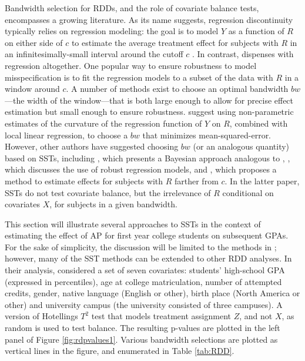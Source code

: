 \documentclass[sts]{imsart}\usepackage[]{graphicx}\usepackage[]{color}
\begin{document}
Bandwidth selection for RDDs, and the role of covariate balance tests,
encompasses a growing literature.
As its name suggests, regression discontinuity typically relies on
regression modeling: the goal is to model $Y$ as a function of $R$ on
either side of $c$ to estimate the average treatment effect for
subjects with $R$ in an infinitesimally-small interval around the
cutoff $c$ \citep[See][]{imbensLemiuxRDD}.
In contrast, \citet{cft} dispenses with regression altogether.
One popular way to ensure robustness to model misspecification is to
fit the regression models to a subset of the data with $R$ in a
window around $c$.
A number of methods exist to choose an optimal bandwidth $bw$---the width
of the window---that is both large enough to allow for precise effect
estimation but small enough to ensure robustness.
\citet{IK} suggest using non-parametric estimates of the curvature of
the regression function of $Y$ on $R$, combined with local linear
regression, to choose a $bw$ that minimizes mean-squared-error.
However, other authors have suggested choosing $bw$ (or an analogous quantity) based on
SSTs, including \citet{mattai}, which presents a Bayesian approach
analogous to \citet{cft}, \citet{salesHansen}, which discusses the use of robust
regression models,  and \citet{angristWanna}, which proposes a method
to estimate effects for subjects with $R$ farther from $c$.
In the latter paper, SSTs do not test covariate balance, but the
irrelevance of $R$ conditional on covariates $X$, for subjects in a
given bandwidth.

This section will illustrate several approaches to SSTs in the context
of estimating the effect of AP for first year college students on
subsequent GPAs.
For the sake of simplicity, the discussion will be limited to the methods in \citet{cft}; however, many of
the SST methods can be extended to other RDD analyses.
In their analysis, \citet{lso}  considered a set of seven covariates:
students' high-school GPA (expressed in percentiles), age at college
matriculation, number of attempted credits, gender, native language
(English or other), birth place (North America or other) and
university campus (the university consisted of three campuses).
A version of Hotellings $T^2$ test that models
treatment assignment $Z$, and not $X$, as random \citep{hansenBowers}
is used to test balance.
The resulting p-values are plotted in the left panel of Figure \ref{fig:rdpvalues1}.
Various bandwidth selections are plotted as vertical lines in the
figure, and enumerated in Table \ref{tab:RDD}.
\end{document}
